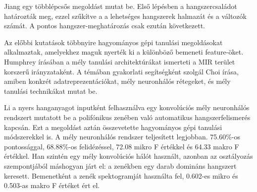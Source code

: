Jiang \cite{Jiang2013} egy többlépcsős megoldást mutat be. Első lépésben a hangszercsaládot határozták meg, ezzel szűkítve a a lehetséges hangszerek halmazát és a változók számát. A pontos hangszer-meghatározás csak ezután következett.

Az előbbi kutatások többnyire hagyományos gépi tanulási megoldásokat alkalmaztak, amelyekhez maguk nyerték ki a különböző bemeneti feature-öket. Humphrey \cite{humphrey2012} írásában a mély tanulási architektúrákat ismerteti a MIR terület korszerű irányzataként. A témában gyakorlati segítségként szolgál Choi \cite{Choi2017} írása, amiben konkrét adatreprezentációkat, mély neuronhálós rétegeket, és mély tanulási technikákat mutat be.

Li \cite{li2015automatic} a nyers hanganyagot inputként felhasználva egy konvolúciós mély neuronhálós rendszert mutatott be a polifónikus zenében való automatikus hangszerfelismerés kapcsán. Ezt a megoldást aztán összevetette hagyományos gépi tanulási módszerekkel is. A mély neuronhálós rendszer teljesített legjobban. 75.60\%-os pontossággal, 68.88\%-os felidézéssel, 72.08 mikro F értékkel és 64.33 makro F értékkel. Han \cite{han2016deep} szintén egy mély konvolúciós hálót használt, azonban az osztályozás szempontjából máshogyan járt el: a zenékben egy darab domináns hangszert keresett. Bemenetként a zenék spektogramját használta fel, 0.602-es mikro és 0.503-as makro F értéket ért el.